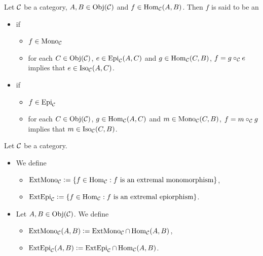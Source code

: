\documentclass{book}
\begin{document}
	\begin{defn}
		Let $\mathcal{C}$ be a category, $A, B \in \operatorname{Obj}(\mathcal{C})$ and $f \in \operatorname{Hom}_{\mathcal{C}}(A,B)$. Then $f$ is said to be an
		\begin{itemize}
			\item {} if 
			\begin{itemize}
				\item $f \in \operatorname{Mono}_{\mathcal{C}}$ 
				\item for each $C \in \operatorname{Obj}(\mathcal{C})$, $e \in \operatorname{Epi}_{\mathcal{C}}(A, C)$ and $g \in \operatorname{Hom}_{\mathcal{C}}(C, B)$, $f = g \circ_{\mathcal{C}} e$ implies that $e \in \operatorname{Iso}_{\mathcal{C}}(A, C)$. 
			\end{itemize}
			\item {} if 
			\begin{itemize}
				\item $f \in \operatorname{Epi}_{\mathcal{C}}$ 
				\item for each $C \in \operatorname{Obj}(\mathcal{C})$, $g \in \operatorname{Hom}_{\mathcal{C}}(A, C)$ and $m \in \operatorname{Mono}_{\mathcal{C}}(C, B)$, $f = m \circ_{\mathcal{C}} g$ implies that $m \in \operatorname{Iso}_{\mathcal{C}}(C, B)$. 
			\end{itemize}
		\end{itemize}
	\end{defn}
	
	\begin{defn}
		Let $\mathcal{C}$ be a category.
		\begin{itemize}
			\item We define 
			\begin{itemize}
				\item $\operatorname{ExtMono}_{\mathcal{C}} \vcentcolon= \{f \in \operatorname{Hom}_{\mathcal{C}}: \text{$f$ is an extremal monomorphism}\}$,
				\item $\operatorname{ExtEpi}_{\mathcal{C}} \vcentcolon= \{f \in \operatorname{Hom}_{\mathcal{C}}: \text{$f$ is an extremal epiorphism}\}$.
			\end{itemize}
			\item Let $A,B \in \operatorname{Obj}(\mathcal{C})$. We define 
			\begin{itemize}
				\item $\operatorname{ExtMono}_{\mathcal{C}}(A,B) \vcentcolon= \operatorname{ExtMono}_{\mathcal{C}} \cap \operatorname{Hom}_{\mathcal{C}}(A,B)$,
				\item $\operatorname{ExtEpi}_{\mathcal{C}}(A,B) \vcentcolon= \operatorname{ExtEpi}_{\mathcal{C}} \cap \operatorname{Hom}_{\mathcal{C}}(A,B)$.
			\end{itemize}
		\end{itemize}
	\end{defn}
	
\end{document}
